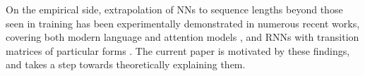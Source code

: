 On the empirical side, extrapolation of NNs to sequence lengths beyond those seen in training has been experimentally demonstrated in numerous recent works, covering both modern language and attention models \citep{press2022train, anil2022exploring, zhang2022unveiling}, and RNNs with transition matrices of particular forms \citep{gu2022efficiently, gu2021combining, gu2020hippo, gupta2022diagonal}. 
The current paper is motivated by these findings, and takes a step towards theoretically explaining them.